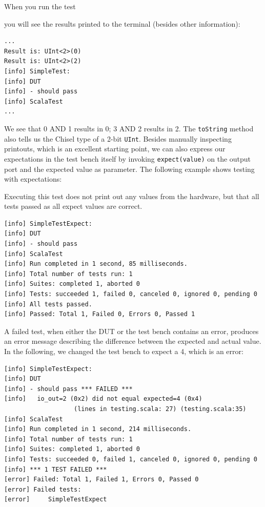 \documentclass[%
    10pt,
    headinclude, footexclude,
    openright, %
    notitlepage,
    cleardoubleempty,
    headsepline,
    pointlessnumbers,
    bibtotoc, idxtotoc,
    ]{scrbook}
\newcommand{\code}[1]{{\small{\texttt{#1}}}}
\begin{document}
When you run the test


\noindent you will see the results printed to the terminal
(besides other information):

\begin{verbatim}
...
Result is: UInt<2>(0)
Result is: UInt<2>(2)
[info] SimpleTest:
[info] DUT
[info] - should pass
[info] ScalaTest
...
\end{verbatim}

We see that 0 AND 1 results in 0; 3 AND 2 results in 2.
The \code{toString} method also tells us the Chisel type of a 2-bit \code{UInt}.
Besides manually inspecting printouts, which is an excellent starting point, we can also
express our expectations in the test bench itself by invoking
\code{expect(value)} on the output port and the expected value as parameter.
The following example shows testing with expectations:


Executing this test does not print out any values from the hardware,
but that all tests passed as all expect values are correct.

\begin{verbatim}
[info] SimpleTestExpect:
[info] DUT
[info] - should pass
[info] ScalaTest
[info] Run completed in 1 second, 85 milliseconds.
[info] Total number of tests run: 1
[info] Suites: completed 1, aborted 0
[info] Tests: succeeded 1, failed 0, canceled 0, ignored 0, pending 0
[info] All tests passed.
[info] Passed: Total 1, Failed 0, Errors 0, Passed 1
\end{verbatim}

A failed test, when either the DUT or the test bench contains an error,
produces an error message describing the difference between the expected and actual
value. In the following, we changed the test bench to expect a 4, which is an error:

\begin{verbatim}
[info] SimpleTestExpect:
[info] DUT
[info] - should pass *** FAILED ***
[info]   io_out=2 (0x2) did not equal expected=4 (0x4) 
                   (lines in testing.scala: 27) (testing.scala:35)
[info] ScalaTest
[info] Run completed in 1 second, 214 milliseconds.
[info] Total number of tests run: 1
[info] Suites: completed 1, aborted 0
[info] Tests: succeeded 0, failed 1, canceled 0, ignored 0, pending 0
[info] *** 1 TEST FAILED ***
[error] Failed: Total 1, Failed 1, Errors 0, Passed 0
[error] Failed tests:
[error] 	SimpleTestExpect
\end{verbatim}
\end{document}
